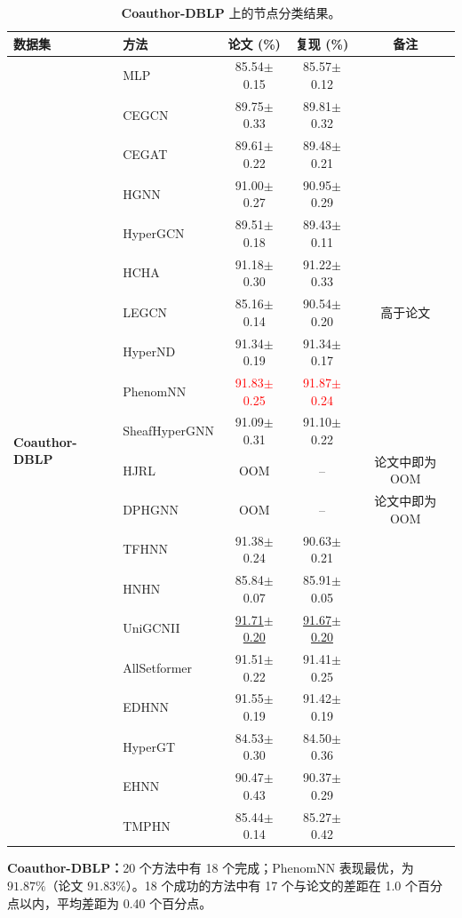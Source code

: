 \documentclass[11pt,a4paper]{article}
\begin{document}
\begin{table}[H]
	\centering\small
	\begin{tabular}{llccc}
		\toprule
		数据集 & 方法 & 论文 (\%) & 复现 (\%) & 备注 \\
		\midrule
		\multirow{20}{*}{\textbf{Coauthor-DBLP}} & MLP               & 85.54$\pm$0.15   & 85.57$\pm$0.12   &  \\
		 & CEGCN             & 89.75$\pm$0.33   & 89.81$\pm$0.32   &  \\
		 & CEGAT             & 89.61$\pm$0.22   & 89.48$\pm$0.21   &  \\
		 & HGNN              & 91.00$\pm$0.27   & 90.95$\pm$0.29   &  \\
		 & HyperGCN          & 89.51$\pm$0.18   & 89.43$\pm$0.11   &  \\
		 & HCHA              & 91.18$\pm$0.30   & 91.22$\pm$0.33   &  \\
		 & LEGCN             & 85.16$\pm$0.14   & 90.54$\pm$0.20   & 高于论文 \\
		 & HyperND           & 91.34$\pm$0.19   & 91.34$\pm$0.17   &  \\
		 & PhenomNN          & \textcolor{red}{91.83$\pm$0.25}   & \textcolor{red}{91.87$\pm$0.24}   &  \\
		 & SheafHyperGNN     & 91.09$\pm$0.31   & 91.10$\pm$0.22   &  \\
		 & HJRL              & OOM              & --               & 论文中即为 OOM \\
		 & DPHGNN            & OOM              & --               & 论文中即为 OOM \\
		 & TFHNN             & 91.38$\pm$0.24   & 90.63$\pm$0.21   &  \\
		 & HNHN              & 85.84$\pm$0.07   & 85.91$\pm$0.05   &  \\
		 & UniGCNII          & \underline{91.71$\pm$0.20}   & \underline{91.67$\pm$0.20}   &  \\
		 & AllSetformer      & 91.51$\pm$0.22   & 91.41$\pm$0.25   &  \\
		 & EDHNN             & 91.55$\pm$0.19   & 91.42$\pm$0.19   &  \\
		 & HyperGT           & 84.53$\pm$0.30   & 84.50$\pm$0.36   &  \\
		 & EHNN              & 90.47$\pm$0.43   & 90.37$\pm$0.29   &  \\
		 & TMPHN             & 85.44$\pm$0.14   & 85.27$\pm$0.42   &  \\
		\bottomrule
	\end{tabular}
	\caption{\textbf{Coauthor-DBLP} 上的节点分类结果。}
\end{table}
\par\smallskip
\noindent\textbf{Coauthor-DBLP：}20 个方法中有 18 个完成；PhenomNN 表现最优，为 $91.87\%$（论文 $91.83\%$）。18 个成功的方法中有 17 个与论文的差距在 1.0 个百分点以内，平均差距为 0.40 个百分点。
\end{document}
